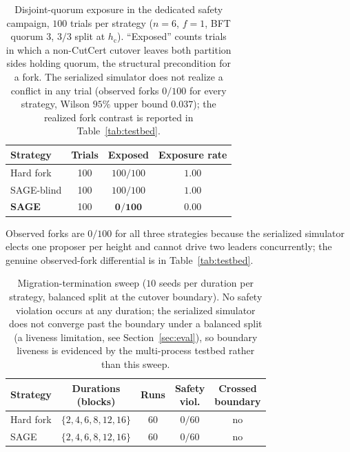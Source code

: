 \documentclass[journal]{IEEEtran}
\begin{document}
\begin{table}[h]
\centering
\begin{threeparttable}
\caption{Disjoint-quorum exposure in the dedicated safety campaign,
$100$ trials per strategy ($n{=}6$, $f{=}1$, BFT quorum $3$, $3/3$ split at $h_{\mathrm{c}}$).
``Exposed'' counts trials in which a non-CutCert cutover leaves both partition sides holding
quorum, the structural precondition for a fork. The serialized simulator does not realize a
conflict in any trial (observed forks $0/100$ for every strategy, Wilson $95\%$ upper bound
$0.037$); the realized fork contrast is reported in Table~\ref{tab:testbed}.}
\label{tab:appsafety}
\setlength{\tabcolsep}{6pt}\renewcommand{\arraystretch}{1.15}\footnotesize
\begin{tabular}{lccc}
\toprule
Strategy & Trials & Exposed & Exposure rate \\
\midrule
Hard fork     & 100 & $100/100$         & $1.00$ \\
SAGE-blind    & 100 & $100/100$         & $1.00$ \\
\textbf{SAGE} & 100 & $\mathbf{0/100}$  & $\mathbf{0.00}$ \\
\bottomrule
\end{tabular}
\begin{tablenotes}\footnotesize
\item Observed forks are $0/100$ for all three strategies because the serialized simulator
elects one proposer per height and cannot drive two leaders concurrently; the genuine
observed-fork differential is in Table~\ref{tab:testbed}.
\end{tablenotes}
\end{threeparttable}
\end{table}

\begin{table}[h]
\centering
\caption{Migration-termination sweep
($10$ seeds per duration per strategy, balanced split at the cutover boundary). No safety violation
occurs at any duration; the serialized simulator does not converge past the boundary under a
balanced split (a liveness limitation, see Section~\ref{sec:eval}), so boundary liveness is
evidenced by the multi-process testbed rather than this sweep.}
\label{tab:apptermination}
\setlength{\tabcolsep}{4pt}\renewcommand{\arraystretch}{1.15}\footnotesize
\begin{tabular}{lcccc}
\toprule
Strategy & \makecell{Durations\\(blocks)} & Runs & \makecell{Safety\\viol.} & \makecell{Crossed\\boundary} \\
\midrule
Hard fork & $\{2,4,6,8,12,16\}$ & 60 & $0/60$ & no \\
SAGE      & $\{2,4,6,8,12,16\}$ & 60 & $0/60$ & no \\
\bottomrule
\end{tabular}
\end{table}
\end{document}
